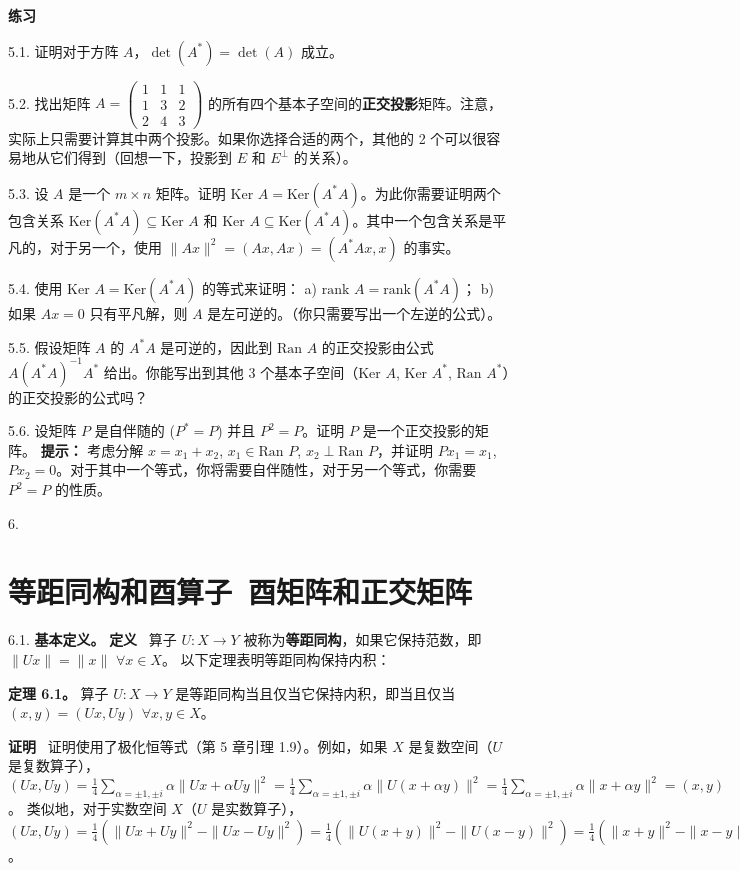 \textbf{练习}~

5.1. 证明对于方阵 $A$，$\det(A^*) = \det(A)$ 成立。

5.2. 找出矩阵 $A = \begin{pmatrix} 1 & 1 & 1 \\ 1 & 3 & 2 \\ 2 & 4 & 3 \end{pmatrix}$ 的所有四个基本子空间的\textbf{正交投影}矩阵。注意，实际上只需要计算其中两个投影。如果你选择合适的两个，其他的 2 个可以很容易地从它们得到（回想一下，投影到 $E$ 和 $E^\perp$ 的关系）。

5.3. 设 $A$ 是一个 $m \times n$ 矩阵。证明 $\text{Ker } A = \text{Ker}(A^*A)$。为此你需要证明两个包含关系 $\text{Ker}(A^*A) \subseteq \text{Ker } A$ 和 $\text{Ker } A \subseteq \text{Ker}(A^*A)$。其中一个包含关系是平凡的，对于另一个，使用 $\|Ax\|^2 = (Ax, Ax) = (A^*Ax, x)$ 的事实。

5.4. 使用 $\text{Ker } A = \text{Ker}(A^*A)$ 的等式来证明：
a) $\text{rank } A = \text{rank}(A^*A)$；
b) 如果 $Ax = 0$ 只有平凡解，则 $A$ 是左可逆的。（你只需要写出一个左逆的公式）。

5.5. 假设矩阵 $A$ 的 $A^*A$ 是可逆的，因此到 $\text{Ran } A$ 的正交投影由公式 $A(A^*A)^{-1}A^*$ 给出。你能写出到其他 3 个基本子空间（$\text{Ker } A$, $\text{Ker } A^*$, $\text{Ran } A^*$）的正交投影的公式吗？

5.6. 设矩阵 $P$ 是自伴随的 ($P^* = P$) 并且 $P^2 = P$。证明 $P$ 是一个正交投影的矩阵。
\textbf{提示：} 考虑分解 $x = x_1 + x_2$, $x_1 \in \text{Ran } P$, $x_2 \perp \text{Ran } P$，并证明 $Px_1 = x_1$, $Px_2 = 0$。对于其中一个等式，你将需要自伴随性，对于另一个等式，你需要 $P^2 = P$ 的性质。





6. 
\section{等距同构和酉算子~酉矩阵和正交矩阵}

6.1. \textbf{基本定义。}
\textbf{定义}~ 算子 $U: X \to Y$ 被称为\textbf{等距同构}，如果它保持范数，即 $\|Ux\| = \|x\|$ $\forall x \in X$。
以下定理表明等距同构保持内积：

\textbf{定理 6.1。} 算子 $U: X \to Y$ 是等距同构当且仅当它保持内积，即当且仅当 $(x, y) = (Ux, Uy)$ $\forall x, y \in X$。

\textbf{证明}~ 证明使用了极化恒等式（第 5 章引理 1.9）。例如，如果 $X$ 是复数空间（$U$ 是复数算子），$(Ux, Uy) = \frac{1}{4} \sum_{\alpha = \pm 1, \pm i} \alpha \|Ux + \alpha Uy\|^2 = \frac{1}{4} \sum_{\alpha = \pm 1, \pm i} \alpha \|U(x + \alpha y)\|^2 = \frac{1}{4} \sum_{\alpha = \pm 1, \pm i} \alpha \|x + \alpha y\|^2 = (x, y)$。
类似地，对于实数空间 $X$（$U$ 是实数算子），$(Ux, Uy) = \frac{1}{4} (\|Ux + Uy\|^2 - \|Ux - Uy\|^2) = \frac{1}{4} (\|U(x+y)\|^2 - \|U(x-y)\|^2) = \frac{1}{4} (\|x+y\|^2 - \|x-y\|^2) = (x, y)$。

